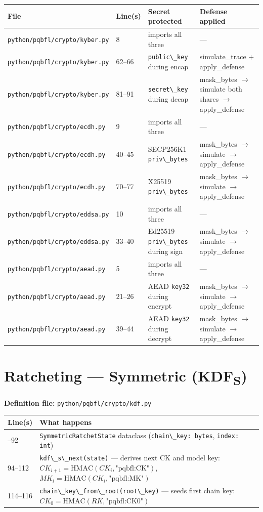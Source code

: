 \documentclass[11pt,a4paper]{article}
\newcommand{\code}[1]{\lstinline[basicstyle=\ttfamily\small]!#1!}
\begin{document}
\begin{longtable}{L{4.5cm} L{1.8cm} L{3.5cm} L{4cm}}
\toprule
\textbf{File} & \textbf{Line(s)} & \textbf{Secret protected} & \textbf{Defense applied} \\
\midrule
\endhead
\bottomrule
\endfoot
\code{python/pqbfl/crypto/kyber.py}  & 8       & imports all three & --- \\
\code{python/pqbfl/crypto/kyber.py}  & 62--66  & \code{public\_key} during encap & simulate\_trace + apply\_defense \\
\code{python/pqbfl/crypto/kyber.py}  & 81--91  & \code{secret\_key} during decap & mask\_bytes $\to$ simulate both shares $\to$ apply\_defense \\
\code{python/pqbfl/crypto/ecdh.py}   & 9       & imports all three & --- \\
\code{python/pqbfl/crypto/ecdh.py}   & 40--45  & SECP256K1 \code{priv\_bytes} & mask\_bytes $\to$ simulate $\to$ apply\_defense \\
\code{python/pqbfl/crypto/ecdh.py}   & 70--77  & X25519 \code{priv\_bytes} & mask\_bytes $\to$ simulate $\to$ apply\_defense \\
\code{python/pqbfl/crypto/eddsa.py}  & 10      & imports all three & --- \\
\code{python/pqbfl/crypto/eddsa.py}  & 33--40  & Ed25519 \code{priv\_bytes} during sign & mask\_bytes $\to$ simulate $\to$ apply\_defense \\
\code{python/pqbfl/crypto/aead.py}   & 5       & imports all three & --- \\
\code{python/pqbfl/crypto/aead.py}   & 21--26  & AEAD \code{key32} during encrypt & mask\_bytes $\to$ simulate $\to$ apply\_defense \\
\code{python/pqbfl/crypto/aead.py}   & 39--44  & AEAD \code{key32} during decrypt & mask\_bytes $\to$ simulate $\to$ apply\_defense \\
\end{longtable}

\section{Ratcheting --- Symmetric (KDF\textsubscript{S})}

\textbf{Definition file:} \code{python/pqbfl/crypto/kdf.py}

\begin{longtable}{L{2.2cm} L{11.5cm}}
\toprule
\textbf{Line(s)} & \textbf{What happens} \\
\midrule
\endhead
\bottomrule
{}--92  & \code{SymmetricRatchetState} dataclass (\code{chain\_key: bytes}, \code{index: int}) \\
94--112 & \code{kdf\_s\_next(state)} --- derives next CK and model key: $CK_{i+1} = \text{HMAC}(CK_i, \text{"pqbfl:CK"})$, $MK_i = \text{HMAC}(CK_i, \text{"pqbfl:MK"})$ \\
114--116 & \code{chain\_key\_from\_root(root\_key)} --- seeds first chain key: $CK_0 = \text{HMAC}(RK, \text{"pqbfl:CK0"})$ \\
\end{longtable}
\end{document}
